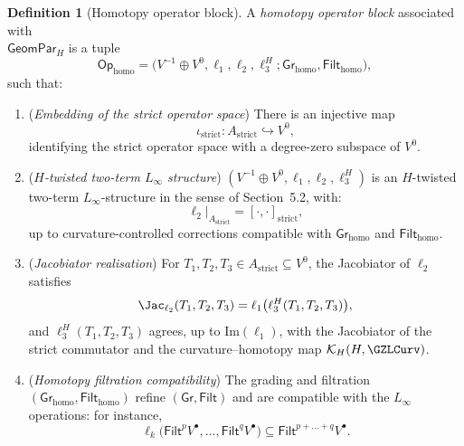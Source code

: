\documentclass[11pt]{book}
\theoremstyle{plain}
\theoremstyle{definition}
\newtheorem{definition}[theorem]{Definition} \theoremstyle{remark}
\begin{document}
\begin{definition}[Homotopy operator block]
A \emph{homotopy operator block} associated with \\
  $\mathsf{GeomPar}_H$ is a tuple
  \[
     \mathsf{Op}_{\mathrm{homo}}
     =
     \bigl(
       V^{-1}\oplus V^0,
       \ell_1,\ell_2,\ell_3^H;
       \mathsf{Gr}_{\mathrm{homo}},\mathsf{Filt}_{\mathrm{homo}}
     \bigr),
  \]
  such that:
  \begin{enumerate}[label=\roman*)]
    \item (\emph{Embedding of the strict operator space})
          There is an injective map
          \[
             \iota_{\mathrm{strict}}:
               A_{\mathrm{strict}}
               \hookrightarrow
               V^0,
          \]
          identifying the strict operator space with a degree-zero
          subspace of $V^0$.
    \item (\emph{$H$-twisted two-term $L_\infty$ structure})
          $(V^{-1}\oplus V^0,\ell_1,\ell_2,\ell_3^H)$ is an
          $H$-twisted two-term $L_\infty$-structure in the sense of
          Section~5.2, with:
          \[
             \ell_2\big|_{A_{\mathrm{strict}}}
             =
             [\cdot,\cdot]_{\mathrm{strict}},
          \]
          up to curvature-controlled corrections compatible with
          $\mathsf{Gr}_{\mathrm{homo}}$ and $\mathsf{Filt}_{\mathrm{homo}}$.
    \item (\emph{Jacobiator realisation})
          For $T_1,T_2,T_3\in A_{\mathrm{strict}}\subseteq V^0$,
          the Jacobiator of $\ell_2$ satisfies
          \[
             \Jac_{\ell_2}(T_1,T_2,T_3)
             =
             \ell_1\bigl(
               \ell_3^H(T_1,T_2,T_3)
             \bigr),
          \]
          and $\ell_3^H(T_1,T_2,T_3)$ agrees, up to $\mathrm{Im}(\ell_1)$,
          with the Jacobiator of the strict commutator and the
          curvature–homotopy map $\mathcal{K}_H(H,\GZLCurv)$.
    \item (\emph{Homotopy filtration compatibility})
          The grading and filtration
          $(\mathsf{Gr}_{\mathrm{homo}},\mathsf{Filt}_{\mathrm{homo}})$
          refine $(\mathsf{Gr},\mathsf{Filt})$ and are compatible with
          the $L_\infty$ operations: for instance,
          \[
             \ell_k\bigl(
               \mathsf{Filt}^pV^{\bullet},\dots,\mathsf{Filt}^qV^{\bullet}
             \bigr)
             \subseteq
             \mathsf{Filt}^{p+\dots+q}V^{\bullet}.
          \]
  \end{enumerate}
\end{definition}
\end{document}
